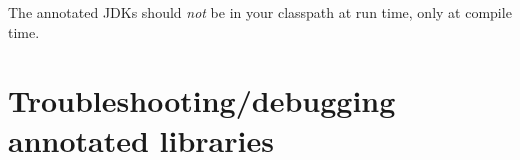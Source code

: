 The annotated JDKs should \emph{not} be in your classpath at run time, only
at compile time.




%
%
%
%
%
%
%


\section{Troubleshooting/debugging annotated libraries\label{libraries-troubleshooting}}

